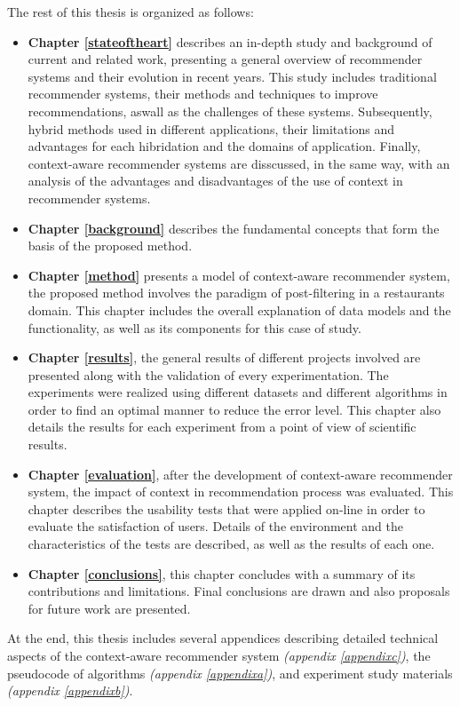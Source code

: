 The rest of this thesis is organized as follows: 
\begin{itemize}  
\item \textbf{Chapter \ref{stateoftheart}} describes an in-depth study
and background of current and related work, presenting a general
overview of recommender systems and their evolution in recent years.
This study includes traditional recommender systems, their methods
and techniques to improve recommendations, aswall as the challenges 
of these systems. Subsequently, hybrid methods used in different
applications, their limitations and advantages for each hibridation and
the domains of application. Finally, context-aware recommender systems
are disscussed, in the same way,  with an analysis of the advantages and
disadvantages of the use of context in recommender systems.
\item \textbf{Chapter \ref{background}} describes the fundamental
concepts that form the basis of the proposed method.
\item \textbf{Chapter \ref{method}} presents a model of context-aware
recommender system, the proposed method involves the paradigm of
post-filtering in a restaurants domain. This chapter includes the
overall explanation of data models and  the functionality, as
well as its components for this case of study.
\item \textbf{Chapter \ref{results}}, the general results of different
projects involved are presented along with the validation of every
experimentation. The experiments were realized using different
datasets and different algorithms in order to find an optimal manner
to reduce the error level. This chapter also details the results for
each experiment from a point of view of scientific results.
\item \textbf{Chapter \ref{evaluation}}, after the development of
context-aware recommender system, the impact of
context in recommendation process was evaluated. 
This chapter describes the
usability tests that were applied on-line in order to evaluate the
satisfaction of users. Details of the environment and the
characteristics of the tests are described, as well as 
the results of each one.
\item \textbf{Chapter \ref{conclusions}}, this chapter concludes with a
summary of its contributions and limitations. Final
conclusions are drawn and also proposals for future work are presented.
\end{itemize}  

At the end, this thesis includes several appendices describing
detailed technical aspects of the context-aware recommender system
\textit{(appendix \ref{appendixc})}, the pseudocode of algorithms
\textit{(appendix \ref{appendixa})}, and experiment study materials 
\textit{(appendix \ref{appendixb})}.
